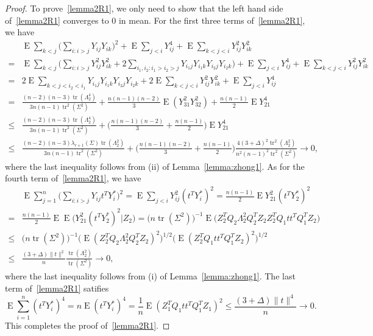 \documentclass[3p]{elsarticle}
\DeclareMathOperator{\mytr}{tr}
\DeclareMathOperator{\myE}{E}
\theoremstyle{plain}
\theoremstyle{definition}
\theoremstyle{remark}
\begin{document}
\begin{proof}
To prove~\eqref{lemma2R1}, we only need to show that the left hand side of~\eqref{lemma2R1} converges to $0$ in mean.
    For the first three terms of~\eqref{lemma2R1}, we have
    \begin{equation*}
    \begin{aligned}
        &\myE\sum_{k<j}\big(\sum_{i:i>j} Y_{ij} Y_{ik}\big)^2
        +\myE\sum_{j<i}Y_{ij}^4
        +\myE\sum_{k<j<i}Y_{ij}^2 Y_{ik}^2
        \\
        =&
        \myE\sum_{k<j}\Big(\sum_{i:i>j} Y_{ij}^2 Y_{ik}^2
        +2\sum_{i_1,i_2:i_1>i_2>j} Y_{i_1 j} Y_{i_1 k} Y_{i_2 j} Y_{i_2 k}\Big)
        +\myE\sum_{j<i}Y_{ij}^4
        +\myE\sum_{k<j<i}Y_{ij}^2 Y_{ik}^2
        \\
        =&
        2\myE\sum_{k<j<i_2<i_1}Y_{i_1 j} Y_{i_1 k} Y_{i_2 j} Y_{i_2 k}
        +2\myE\sum_{k<j<i}Y_{ij}^2 Y_{ik}^2
        +\myE\sum_{j<i}Y_{ij}^4
        \\
        =&
        \frac{(n-2)(n-3) \mytr(\Lambda_2^4)}{3n(n-1)\mytr^2(\Sigma^2)}
        +\frac{n(n-1)(n-2)}{3}\myE (Y_{31}^2 Y_{32}^2)
        +\frac{n(n-1)}{2}\myE Y_{21}^4
        \\
        \leq &
        \frac{(n-2)(n-3) \mytr(\Lambda_2^4)}{3n(n-1)\mytr^2(\Sigma^2)}
        +\Big(\frac{n(n-1)(n-2)}{3} +\frac{n(n-1)}{2}\Big)\myE Y_{21}^4
        \\
        \leq &
        \frac{(n-2)(n-3) \lambda_{r+1}(\Sigma)\mytr(\Lambda_2^2)}{3n(n-1)\mytr^2(\Sigma^2)}
        +\Big(\frac{n(n-1)(n-2)}{3} +\frac{n(n-1)}{2}\Big)
\frac{4(3+\Delta)^2\mytr^2(\Lambda_2^2)}{n^2(n-1)^2\mytr^2(\Sigma^2)}
        \to  0,
    \end{aligned}
    \end{equation*}
    where the last inequality follows from (ii) of Lemma~\ref{lemma:zhong1}.
    As for the fourth term of~\eqref{lemma2R1}, we have
$$
\begin{aligned}
    &\myE\sum_{j=1}^n \big(\sum_{i:i>j} Y_{ij} t^T Y_i^*\big)^2
=
    \myE\sum_{j<i} Y_{ij}^2 (t^T Y_i^{*})^2
    =
    \frac{n(n-1)}{2} \myE Y_{21}^2 (t^T Y_2^{*})^2
    \\
    =&
    \frac{n(n-1)}{2}  
    \myE \myE\big(Y_{21}^2 (t^T Y_2^{*})^2\big| Z_2\big)
    =\big(n\mytr(\Sigma^2)\big)^{-1} \myE \big( Z_2^T Q_2 \Lambda_2^2 Q_2^T Z_2 Z_2^T Q_1 t t^T Q_1^T Z_2\big) \\
    \leq&
    \big( n \mytr(\Sigma^2)\big)^{-1} 
    \big(\myE (Z_2^T Q_2 \Lambda_2^2 Q_2^T Z_2)^2\big)^{1/2} \big(\myE(Z_2^T Q_1 t t^T Q_1^T Z_2)^2\big)^{1/2}\\
    \leq&
     \frac{(3+\Delta) \|t\|^2}{n} 
    \frac{\mytr (\Lambda_2^2)}{\mytr(\Sigma^2)}\to 0,
\end{aligned}
$$
    where the last inequality follows from (i) of Lemma~\ref{lemma:zhong1}. 
    The last term of~\eqref{lemma2R1} satifies 
$$
        \myE\sum_{i=1}^n (t^T Y_i^*)^4=n \myE (t^T Y_i^*)^4
=\frac{1}{n} \myE (Z_1^T Q_1 t t^T Q_1^T Z_1)^2
\leq \frac{(3+\Delta)\|t\|^4}{n}\to 0.
$$
This completes the proof of~\eqref{lemma2R1}.




\end{proof}
\end{document}
